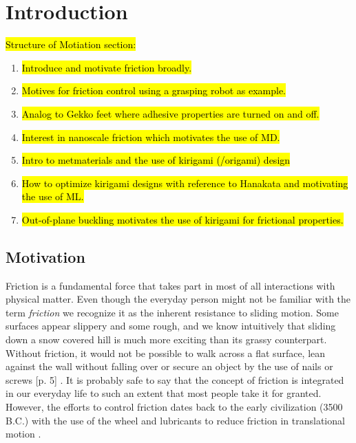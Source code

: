 \chapter{Introduction}

\hl{Structure of Motiation section:}
\begin{enumerate}
    \item \hl{Introduce and motivate friction broadly.}
    \item \hl{Motives for friction control using a grasping robot as example.}
    \item \hl{Analog to Gekko feet where adhesive properties are turned on and off.}
    \item \hl{Interest in nanoscale friction which motivates the use of MD.}
    \item \hl{Intro to metmaterials and the use of kirigami (/origami) design}
    \item \hl{How to optimize kirigami designs with reference to Hanakata and motivating the use of ML.}
    \item \hl{Out-of-plane buckling motivates the use of kirigami for frictional properties.}
\end{enumerate}

\section{Motivation}
Friction is a fundamental force that takes part in most of all interactions with
physical matter. Even though the everyday person might not be familiar with the
term \textit{friction} we recognize it as the inherent resistance to sliding
motion. Some surfaces appear slippery and some rough, and we know intuitively
that sliding down a snow covered hill is much more exciting than its grassy
counterpart. Without friction, it would not be possible to walk across a flat
surface, lean against the wall without falling over or secure an object by the use
of nails or screws [p. 5] \cite{gnecco_meyer_2015}. It is probably safe to say that the concept of friction is integrated in our everyday life to such an extent that
most people take it for granted. However, the efforts to control friction dates
back to the early civilization (3500 B.C.) with the use of the wheel and
lubricants to reduce friction in translational motion \cite{bhushan_2013}. 


